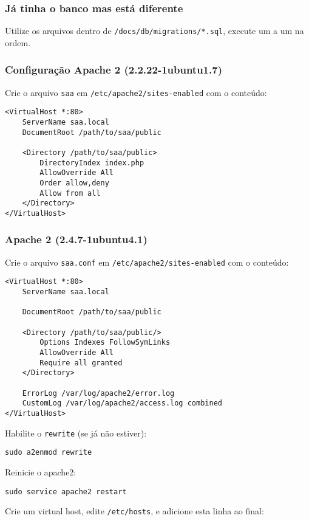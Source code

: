 \subsubsection{Já tinha o banco mas está diferente}

Utilize os arquivos dentro de \texttt{/docs/db/migrations/*.sql},
execute um a um na ordem.

\subsubsection{Configuração Apache 2 (2.2.22-1ubuntu1.7)}

Crie o arquivo \texttt{saa} em \texttt{/etc/apache2/sites-enabled} com o
conteúdo:

\begin{verbatim}
<VirtualHost *:80>
    ServerName saa.local
    DocumentRoot /path/to/saa/public

    <Directory /path/to/saa/public>
        DirectoryIndex index.php
        AllowOverride All
        Order allow,deny
        Allow from all
    </Directory>
</VirtualHost>
\end{verbatim}
\subsubsection{Apache 2 (2.4.7-1ubuntu4.1)}

Crie o arquivo \texttt{saa.conf} em \texttt{/etc/apache2/sites-enabled}
com o conteúdo:

\begin{verbatim}
<VirtualHost *:80>
    ServerName saa.local

    DocumentRoot /path/to/saa/public

    <Directory /path/to/saa/public/>
        Options Indexes FollowSymLinks
        AllowOverride All
        Require all granted
    </Directory>

    ErrorLog /var/log/apache2/error.log
    CustomLog /var/log/apache2/access.log combined
</VirtualHost>
\end{verbatim}
Habilite o \texttt{rewrite} (se já não estiver):

\begin{verbatim}
sudo a2enmod rewrite
\end{verbatim}
Reinicie o apache2:

\begin{verbatim}
sudo service apache2 restart
\end{verbatim}
Crie um virtual host, edite \texttt{/etc/hosts}, e adicione esta linha
ao final:

